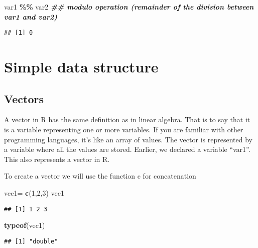 \documentclass[
]{article}
\newenvironment{Shaded}{\begin{snugshade}}{\end{snugshade}}
\newcommand{\DecValTok}[1]{\textcolor[rgb]{0.00,0.00,0.81}{#1}}
\newcommand{\DocumentationTok}[1]{\textcolor[rgb]{0.56,0.35,0.01}{\textbf{\textit{#1}}}}
\newcommand{\FunctionTok}[1]{\textcolor[rgb]{0.13,0.29,0.53}{\textbf{#1}}}
\newcommand{\NormalTok}[1]{#1}
\newcommand{\OtherTok}[1]{\textcolor[rgb]{0.56,0.35,0.01}{#1}}
\newcommand{\SpecialCharTok}[1]{\textcolor[rgb]{0.81,0.36,0.00}{\textbf{#1}}}
\begin{document}
\begin{Shaded}
\begin{Highlighting}[]
\NormalTok{var1 }\SpecialCharTok{\%\%}\NormalTok{ var2 }\DocumentationTok{\#\# modulo operation (remainder of the division between var1 and var2)}
\end{Highlighting}
\end{Shaded}

\begin{verbatim}
## [1] 0
\end{verbatim}

\hypertarget{simple-data-structure}{%
\section{Simple data structure}\label{simple-data-structure}}

\hypertarget{vectors}{%
\subsection{Vectors}\label{vectors}}

A vector in R has the same definition as in linear algebra. That is to
say that it is a variable representing one or more variables. If you are
familiar with other programming languages, it's like an array of values.
The vector is represented by a variable where all the values are stored.
Earlier, we declared a variable ``var1''. This also represents a vector
in R.

To create a vector we will use the function c for concatenation

\begin{Shaded}
\begin{Highlighting}[]
\NormalTok{vec1}\OtherTok{=} \FunctionTok{c}\NormalTok{(}\DecValTok{1}\NormalTok{,}\DecValTok{2}\NormalTok{,}\DecValTok{3}\NormalTok{)}
\NormalTok{vec1}
\end{Highlighting}
\end{Shaded}

\begin{verbatim}
## [1] 1 2 3
\end{verbatim}

\begin{Shaded}
\begin{Highlighting}[]
\FunctionTok{typeof}\NormalTok{(vec1)}
\end{Highlighting}
\end{Shaded}

\begin{verbatim}
## [1] "double"
\end{verbatim}
\end{document}
